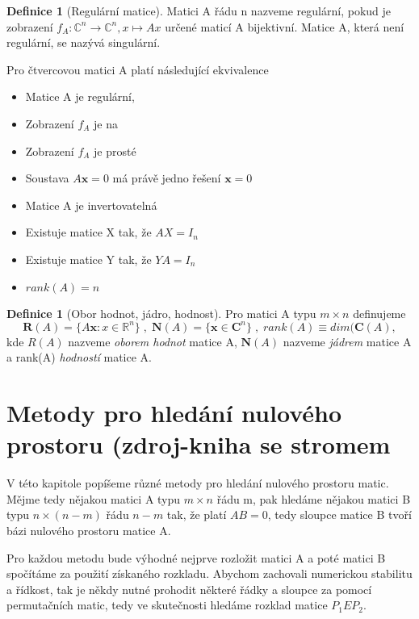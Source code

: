 \documentclass{article}
\theoremstyle{plain}
\theoremstyle{definition}
\newtheorem{definice}[veta]{Definice}
\begin{document}
\begin{definice}[Regulární matice]
    Matici A řádu n nazveme regulární, pokud je zobrazení $f_A:\mathbb{C}^n \rightarrow \mathbb{C}^n,x\mapsto Ax$ určené maticí A bijektivní. Matice A, která není regulární, se nazývá singulární.
\end{definice}
    Pro čtvercovou matici A platí následující ekvivalence
\begin{itemize}
    \item Matice A je regulární,
    \item Zobrazení $f_A$ je na
    \item Zobrazení $f_A$ je prosté
    \item Soustava $A\mathbf{x}=0$ má právě jedno řešení $\mathbf{x}=0$
    \item Matice A je invertovatelná
    \item Existuje matice X tak, že $AX=I_n$
    \item Existuje matice Y tak, že $YA=I_n$
    \item $rank(A)=n$
\end{itemize}
\begin{definice}[Obor hodnot, jádro, hodnost]
Pro matici A typu $m \times n$ definujeme $$\mathbf{R}(A)=\{A\mathbf{x}:x\in \mathbb{R}^n\}\;, \;\mathbf{N}(A)=\{\mathbf{x}\in\mathbf{C}^n\}\;,\; rank(A)\equiv dim(\mathbf{C}(A),$$ kde $R(A)$ nazveme \emph{oborem hodnot} matice A, $\mathbf{N}(A)$ nazveme \emph{jádrem} matice A a rank(A) \emph{hodností} matice A. 
    
\end{definice}

\newpage

\section{Metody pro hledání nulového prostoru (zdroj-kniha se stromem}
V této kapitole popíšeme různé metody pro hledání nulového prostoru matic. Mějme tedy nějakou matici A typu $m \times n$ řádu m, pak hledáme nějakou matici B typu $n \times (n-m)$ řádu $n-m$ tak, že platí $AB=0$, tedy sloupce matice B tvoří bázi nulového prostoru matice A.

Pro každou metodu bude výhodné nejprve rozložit matici A a poté matici B spočítáme za použití získaného rozkladu. Abychom zachovali numerickou stabilitu a řídkost, tak je někdy nutné prohodit některé řádky a sloupce za pomocí permutačních matic, tedy ve skutečnosti hledáme rozklad matice $P_1 E P_2$.
\end{document}
